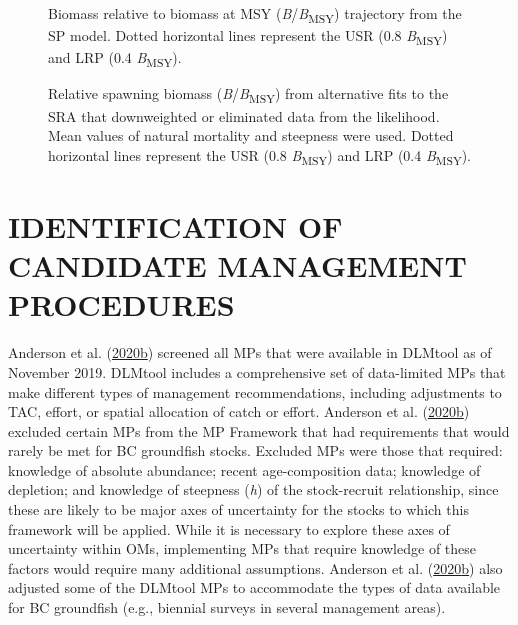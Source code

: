 \documentclass[11pt]{book}
\begin{document}
\begin{figure}[htb]

{\centering {} 

}

\caption{Biomass relative to biomass at MSY (\emph{B}/\emph{B}\textsubscript{MSY}) trajectory from the SP model. Dotted horizontal lines represent the USR (0.8 \emph{B}\textsubscript{MSY}) and LRP (0.4 \emph{B}\textsubscript{MSY}).}\label{fig:spm-biomass}
\end{figure}

\begin{figure}[htb]

{\centering {} 

}

\caption{Relative spawning biomass (\emph{B}/\emph{B}\textsubscript{MSY}) from alternative fits to the SRA that downweighted or eliminated data from the likelihood. Mean values of natural mortality and steepness were used. Dotted horizontal lines represent the USR (0.8 \emph{B}\textsubscript{MSY}) and LRP (0.4 \emph{B}\textsubscript{MSY}).}\label{fig:alt-SRA-fit}
\end{figure}
\clearpage

\hypertarget{sec:mp}{%
\section{IDENTIFICATION OF CANDIDATE MANAGEMENT PROCEDURES}\label{sec:mp}}

Anderson et al. (\protect\hyperlink{ref-anderson2020gfmp}{2020}\protect\hyperlink{ref-anderson2020gfmp}{b}) screened all MPs that were available in DLMtool as of November 2019. DLMtool includes a comprehensive set of data-limited MPs that make different types of management recommendations, including adjustments to TAC, effort, or spatial allocation of catch or effort. Anderson et al. (\protect\hyperlink{ref-anderson2020gfmp}{2020}\protect\hyperlink{ref-anderson2020gfmp}{b}) excluded certain MPs from the MP Framework that had requirements that would rarely be met for BC groundfish stocks. Excluded MPs were those that required: knowledge of absolute abundance; recent age-composition data; knowledge of depletion; and knowledge of steepness (\emph{h}) of the stock-recruit relationship, since these are likely to be major axes of uncertainty for the stocks to which this framework will be applied. While it is necessary to explore these axes of uncertainty within OMs, implementing MPs that require knowledge of these factors would require many additional assumptions. Anderson et al. (\protect\hyperlink{ref-anderson2020gfmp}{2020}\protect\hyperlink{ref-anderson2020gfmp}{b}) also adjusted some of the DLMtool MPs to accommodate the types of data available for BC groundfish (e.g., biennial surveys in several management areas).
\end{document}
